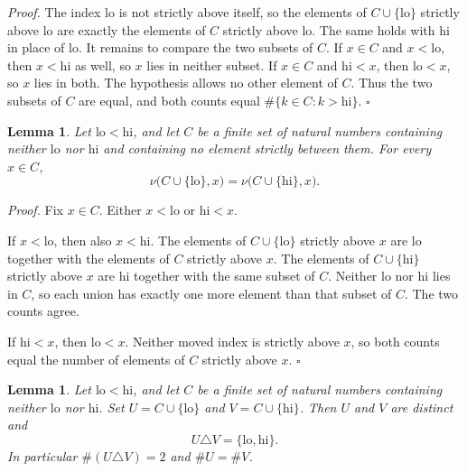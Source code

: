 \documentclass[11pt,letterpaper]{article}
\newtheorem{lemma}[theorem]{Lemma}
\newenvironment{proof}{\noindent\textit{Proof.}}{\hfill\(\square\)}
\begin{document}
\begin{proof}
The index \(\mathrm{lo}\) is not strictly above itself, so the elements of \(C\cup\{\mathrm{lo}\}\) strictly above \(\mathrm{lo}\) are exactly the elements of \(C\) strictly above \(\mathrm{lo}\). The same holds with \(\mathrm{hi}\) in place of \(\mathrm{lo}\). It remains to compare the two subsets of \(C\). If \(x\in C\) and \(x<\mathrm{lo}\), then \(x<\mathrm{hi}\) as well, so \(x\) lies in neither subset. If \(x\in C\) and \(\mathrm{hi}<x\), then \(\mathrm{lo}<x\), so \(x\) lies in both. The hypothesis allows no other element of \(C\). Thus the two subsets of \(C\) are equal, and both counts equal \(\#\{k\in C:k>\mathrm{hi}\}\).
\end{proof}

\begin{lemma}
\label{lem:common}
Let \(\mathrm{lo}<\mathrm{hi}\), and let \(C\) be a finite set of natural numbers containing neither \(\mathrm{lo}\) nor \(\mathrm{hi}\) and containing no element strictly between them. For every \(x\in C\),
\[
\nu\bigl(C\cup\{\mathrm{lo}\},x\bigr)=\nu\bigl(C\cup\{\mathrm{hi}\},x\bigr).
\]
\end{lemma}

\begin{proof}
Fix \(x\in C\). Either \(x<\mathrm{lo}\) or \(\mathrm{hi}<x\).

If \(x<\mathrm{lo}\), then also \(x<\mathrm{hi}\). The elements of \(C\cup\{\mathrm{lo}\}\) strictly above \(x\) are \(\mathrm{lo}\) together with the elements of \(C\) strictly above \(x\). The elements of \(C\cup\{\mathrm{hi}\}\) strictly above \(x\) are \(\mathrm{hi}\) together with the same subset of \(C\). Neither \(\mathrm{lo}\) nor \(\mathrm{hi}\) lies in \(C\), so each union has exactly one more element than that subset of \(C\). The two counts agree.

If \(\mathrm{hi}<x\), then \(\mathrm{lo}<x\). Neither moved index is strictly above \(x\), so both counts equal the number of elements of \(C\) strictly above \(x\).
\end{proof}

\begin{lemma}
\label{lem:symdiff}
Let \(\mathrm{lo}<\mathrm{hi}\), and let \(C\) be a finite set of natural numbers containing neither \(\mathrm{lo}\) nor \(\mathrm{hi}\). Set \(U=C\cup\{\mathrm{lo}\}\) and \(V=C\cup\{\mathrm{hi}\}\). Then \(U\) and \(V\) are distinct and
\[
U\triangle V=\{\mathrm{lo},\mathrm{hi}\}.
\]
In particular \(\#(U\triangle V)=2\) and \(\#U=\#V\).
\end{lemma}
\end{document}
